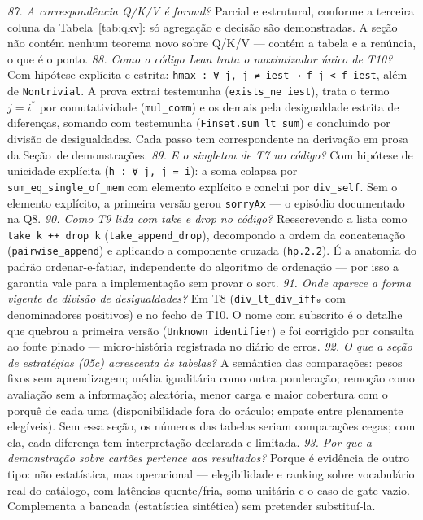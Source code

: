 \textit{87. A correspondência Q/K/V é formal?} Parcial e estrutural, conforme a terceira coluna da Tabela~\ref{tab:qkv}: só agregação e decisão são demonstradas. A seção não contém nenhum teorema novo sobre Q/K/V --- contém a tabela e a renúncia, o que é o ponto.
\textit{88. Como o código Lean trata o maximizador único de T10?} Com hipótese explícita e estrita: \texttt{hmax : ∀ j, j ≠ iest → f j < f iest}, além de \texttt{Nontrivial}. A prova extrai testemunha (\texttt{exists\_ne iest}), trata o termo $j=i^*$ por comutatividade (\texttt{mul\_comm}) e os demais pela desigualdade estrita de diferenças, somando com testemunha (\texttt{Finset.sum\_lt\_sum}) e concluindo por divisão de desigualdades. Cada passo tem correspondente na derivação em prosa da Seção~de demonstrações.
\textit{89. E o singleton de T7 no código?} Com hipótese de unicidade explícita (\texttt{h : ∀ j, j = i}): a soma colapsa por \texttt{sum\_eq\_single\_of\_mem} com elemento explícito e conclui por \texttt{div\_self}. Sem o elemento explícito, a primeira versão gerou \texttt{sorryAx} --- o episódio documentado na Q8.
\textit{90. Como T9 lida com take e drop no código?} Reescrevendo a lista como \texttt{take k ++ drop k} (\texttt{take\_append\_drop}), decompondo a ordem da concatenação (\texttt{pairwise\_append}) e aplicando a componente cruzada (\texttt{hp.2.2}). É a anatomia do padrão ordenar-e-fatiar, independente do algoritmo de ordenação --- por isso a garantia vale para a implementação sem provar o sort.
\textit{91. Onde aparece a forma vigente de divisão de desigualdades?} Em T8 (\texttt{div\_lt\_div\_iff₀} com denominadores positivos) e no fecho de T10. O nome com subscrito é o detalhe que quebrou a primeira versão (\texttt{Unknown identifier}) e foi corrigido por consulta ao fonte pinado --- micro-história registrada no diário de erros.
\textit{92. O que a seção de estratégias (05c) acrescenta às tabelas?} A semântica das comparações: pesos fixos sem aprendizagem; média igualitária como outra ponderação; remoção como avaliação sem a informação; aleatória, menor carga e maior cobertura com o porquê de cada uma (disponibilidade fora do oráculo; empate entre plenamente elegíveis). Sem essa seção, os números das tabelas seriam comparações cegas; com ela, cada diferença tem interpretação declarada e limitada.
\textit{93. Por que a demonstração sobre cartões pertence aos resultados?} Porque é evidência de outro tipo: não estatística, mas operacional --- elegibilidade e ranking sobre vocabulário real do catálogo, com latências quente/fria, soma unitária e o caso de gate vazio. Complementa a bancada (estatística sintética) sem pretender substituí-la.
